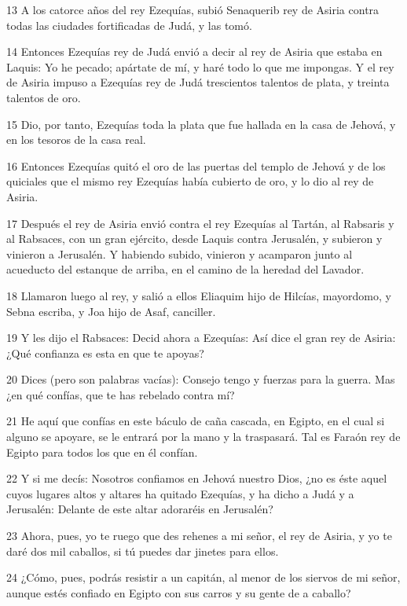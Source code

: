 \par 13 A los catorce años del rey Ezequías, subió Senaquerib rey de Asiria contra todas las ciudades fortificadas de Judá, y las tomó.
\par 14 Entonces Ezequías rey de Judá envió a decir al rey de Asiria que estaba en Laquis: Yo he pecado; apártate de mí, y haré todo lo que me impongas. Y el rey de Asiria impuso a Ezequías rey de Judá trescientos talentos de plata,  y treinta talentos de oro.
\par 15 Dio, por tanto, Ezequías toda la plata que fue hallada en la casa de Jehová, y en los tesoros de la casa real.
\par 16 Entonces Ezequías quitó el oro de las puertas del templo de Jehová y de los quiciales que el mismo rey Ezequías había cubierto de oro, y lo dio al rey de Asiria.
\par 17 Después el rey de Asiria envió contra el rey Ezequías al Tartán, al Rabsaris y al Rabsaces, con un gran ejército, desde Laquis contra Jerusalén, y subieron y vinieron a Jerusalén. Y habiendo subido, vinieron y acamparon junto al acueducto del estanque de arriba, en el camino de la heredad del Lavador.
\par 18 Llamaron luego al rey, y salió a ellos Eliaquim hijo de Hilcías, mayordomo, y Sebna escriba, y Joa hijo de Asaf, canciller.
\par 19 Y les dijo el Rabsaces: Decid ahora a Ezequías: Así dice el gran rey de Asiria: ¿Qué confianza es esta en que te apoyas?
\par 20 Dices (pero son palabras vacías): Consejo tengo y fuerzas para la guerra. Mas ¿en qué confías, que te has rebelado contra mí?
\par 21 He aquí que confías en este báculo de caña cascada, en Egipto, en el cual si alguno se apoyare, se le entrará por la mano y la traspasará. Tal es Faraón rey de Egipto para todos los que en él confían.
\par 22 Y si me decís: Nosotros confiamos en Jehová nuestro Dios, ¿no es éste aquel cuyos lugares altos y altares ha quitado Ezequías, y ha dicho a Judá y a Jerusalén: Delante de este altar adoraréis en Jerusalén?
\par 23 Ahora, pues, yo te ruego que des rehenes a mi señor, el rey de Asiria, y yo te daré dos mil caballos, si tú puedes dar jinetes para ellos.
\par 24 ¿Cómo, pues, podrás resistir a un capitán, al menor de los siervos de mi señor, aunque estés confiado en Egipto con sus carros y su gente de a caballo?
